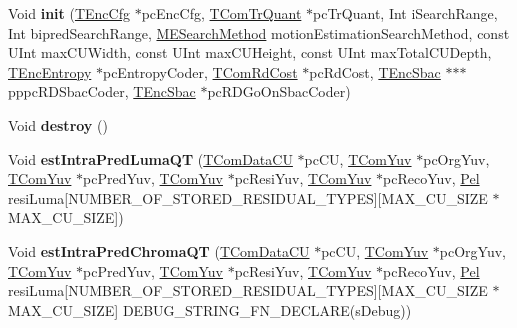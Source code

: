 \begin{DoxyCompactItemize}
\item 
\mbox{\label{class_t_enc_search_a8c79480d15b9a46ab1e7bf03fdf23334}} 
Void {\bfseries init} (\hyperlink{class_t_enc_cfg}{T\+Enc\+Cfg} $\ast$pc\+Enc\+Cfg, \hyperlink{class_t_com_tr_quant}{T\+Com\+Tr\+Quant} $\ast$pc\+Tr\+Quant, Int i\+Search\+Range, Int bipred\+Search\+Range, \hyperlink{_type_def_8h_a8aca966885e6dbeca4cabfc3530a9bde}{M\+E\+Search\+Method} motion\+Estimation\+Search\+Method, const U\+Int max\+C\+U\+Width, const U\+Int max\+C\+U\+Height, const U\+Int max\+Total\+C\+U\+Depth, \hyperlink{class_t_enc_entropy}{T\+Enc\+Entropy} $\ast$pc\+Entropy\+Coder, \hyperlink{class_t_com_rd_cost}{T\+Com\+Rd\+Cost} $\ast$pc\+Rd\+Cost, \hyperlink{class_t_enc_sbac}{T\+Enc\+Sbac} $\ast$$\ast$$\ast$pppc\+R\+D\+Sbac\+Coder, \hyperlink{class_t_enc_sbac}{T\+Enc\+Sbac} $\ast$pc\+R\+D\+Go\+On\+Sbac\+Coder)
\item 
\mbox{\label{class_t_enc_search_a68d1770d9bacc2c901755736ccedf825}} 
Void {\bfseries destroy} ()
\item 
\mbox{\label{class_t_enc_search_a7321ab22fd9b87ee57e0922fceeef01f}} 
Void {\bfseries est\+Intra\+Pred\+Luma\+QT} (\hyperlink{class_t_com_data_c_u}{T\+Com\+Data\+CU} $\ast$pc\+CU, \hyperlink{class_t_com_yuv}{T\+Com\+Yuv} $\ast$pc\+Org\+Yuv, \hyperlink{class_t_com_yuv}{T\+Com\+Yuv} $\ast$pc\+Pred\+Yuv, \hyperlink{class_t_com_yuv}{T\+Com\+Yuv} $\ast$pc\+Resi\+Yuv, \hyperlink{class_t_com_yuv}{T\+Com\+Yuv} $\ast$pc\+Reco\+Yuv, \hyperlink{_type_def_8h_af92141699657699b4b547be0c8517541}{Pel} resi\+Luma\mbox{[}N\+U\+M\+B\+E\+R\+\_\+\+O\+F\+\_\+\+S\+T\+O\+R\+E\+D\+\_\+\+R\+E\+S\+I\+D\+U\+A\+L\+\_\+\+T\+Y\+P\+ES\mbox{]}\mbox{[}M\+A\+X\+\_\+\+C\+U\+\_\+\+S\+I\+ZE $\ast$M\+A\+X\+\_\+\+C\+U\+\_\+\+S\+I\+ZE\mbox{]})
\item 
\mbox{\label{class_t_enc_search_af1d1463ba1d691858ba04bdc09954929}} 
Void {\bfseries est\+Intra\+Pred\+Chroma\+QT} (\hyperlink{class_t_com_data_c_u}{T\+Com\+Data\+CU} $\ast$pc\+CU, \hyperlink{class_t_com_yuv}{T\+Com\+Yuv} $\ast$pc\+Org\+Yuv, \hyperlink{class_t_com_yuv}{T\+Com\+Yuv} $\ast$pc\+Pred\+Yuv, \hyperlink{class_t_com_yuv}{T\+Com\+Yuv} $\ast$pc\+Resi\+Yuv, \hyperlink{class_t_com_yuv}{T\+Com\+Yuv} $\ast$pc\+Reco\+Yuv, \hyperlink{_type_def_8h_af92141699657699b4b547be0c8517541}{Pel} resi\+Luma\mbox{[}N\+U\+M\+B\+E\+R\+\_\+\+O\+F\+\_\+\+S\+T\+O\+R\+E\+D\+\_\+\+R\+E\+S\+I\+D\+U\+A\+L\+\_\+\+T\+Y\+P\+ES\mbox{]}\mbox{[}M\+A\+X\+\_\+\+C\+U\+\_\+\+S\+I\+ZE $\ast$M\+A\+X\+\_\+\+C\+U\+\_\+\+S\+I\+ZE\mbox{]} D\+E\+B\+U\+G\+\_\+\+S\+T\+R\+I\+N\+G\+\_\+\+F\+N\+\_\+\+D\+E\+C\+L\+A\+RE(s\+Debug))

\end{DoxyCompactItemize}
